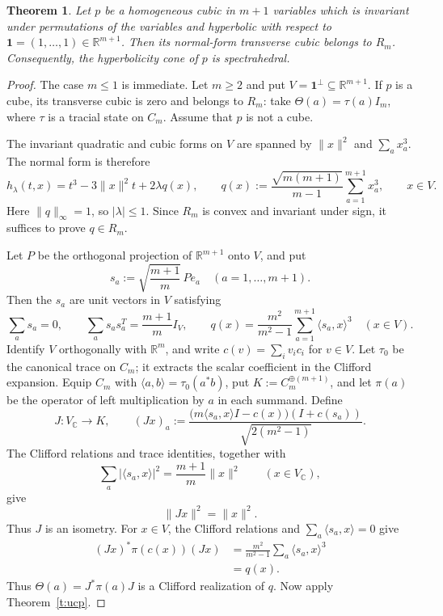 \documentclass[11pt,onecolumn]{article}
\theoremstyle{blueplain}
\newtheorem{theorem}{Theorem}[section]
\theoremstyle{bluedefinition}
\theoremstyle{bluedefinition}
\newcommand{\R}{\mathbb R}
\newcommand{\C}{\mathbb C}
\begin{document}
\begin{theorem}\label{t:symmetric}
Let $p$ be a homogeneous cubic in $m+1$ variables which is invariant under
permutations of the variables and hyperbolic with respect to
$\mathbf1=(1,\ldots,1)\in\R^{m+1}$. Then its normal-form transverse cubic
belongs to $R_m$. Consequently, the hyperbolicity cone of $p$ is
spectrahedral.
\end{theorem}

\begin{proof}
The case $m\leqslant1$ is immediate. Let $m\geqslant2$ and put
$V=\mathbf1^\perp\subseteq\R^{m+1}$. If $p$ is a cube, its transverse cubic
is zero and belongs to $R_m$: take
$\Theta(a)=\tau(a)I_m$, where $\tau$ is a tracial state on $C_m$. Assume that
$p$ is not a cube.

The invariant quadratic and cubic forms on $V$ are spanned by $\|x\|^2$ and
$\sum_ax_a^3$. The normal form is therefore
\[
h_\lambda(t,x)=t^3-3\|x\|^2t+2\lambda q(x),
\qquad
q(x):=\frac{\sqrt{m(m+1)}}{m-1}
\sum_{a=1}^{m+1}x_a^3,
\qquad x\in V.
\]
Here $\|q\|_\infty=1$, so $|\lambda|\leqslant1$. Since
$R_m$ is convex and invariant under sign, it suffices to prove
$q\in R_m$.

Let $P$ be the orthogonal projection of $\R^{m+1}$ onto $V$, and put
\[
s_a:=\sqrt{\frac{m+1}{m}}\,Pe_a
\quad(a=1,\ldots,m+1).
\]
Then the $s_a$ are unit vectors in $V$ satisfying
\[
\sum_as_a=0,
\qquad
\sum_as_as_a^T=\frac{m+1}{m}I_V,
\qquad
q(x)=\frac{m^2}{m^2-1}\sum_{a=1}^{m+1}\langle s_a,x\rangle^3
\quad(x\in V).
\]
Identify $V$ orthogonally with $\R^m$, and write
$c(v)=\sum_i v_i c_i$ for $v\in V$. Let $\tau_0$ be the canonical trace on
$C_m$; it extracts the scalar coefficient in the Clifford expansion. Equip
$C_m$ with $\langle a,b\rangle=\tau_0(a^*b)$, put
$K:=C_m^{\oplus(m+1)}$, and let $\pi(a)$ be the operator of left multiplication
by $a$ in each summand. Define
\[
J\colon V_\C\to K,
\qquad
(Jx)_a:=\frac{
\bigl(m\langle s_a,x\rangle I-c(x)\bigr)(I+c(s_a))}
{\sqrt{2(m^2-1)}}.
\]
The Clifford relations and trace identities, together with
\[
\sum_a\bigl|\langle s_a,x\rangle\bigr|^2
=\frac{m+1}{m}\|x\|^2
\qquad(x\in V_\C),
\]
give
\[
\|Jx\|^2=\|x\|^2.
\]
Thus $J$ is an isometry. For $x\in V$, the Clifford relations and
$\sum_a\langle s_a,x\rangle=0$ give
\begin{align*}
(Jx)^*\pi(c(x))(Jx)
&=\frac{m^2}{m^2-1}\sum_a\langle s_a,x\rangle^3\\
&=q(x).
\end{align*}
Thus $\Theta(a)=J^*\pi(a)J$ is a Clifford realization of $q$. Now apply
Theorem~\ref{t:ucp}.
\end{proof}
\end{document}

